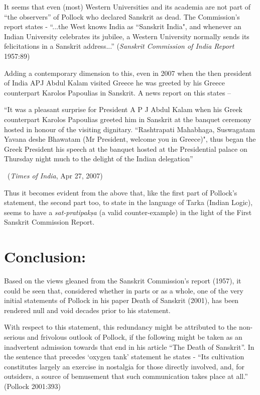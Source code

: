 It seems that even (most) Western Universities and its academia are not part of “the observers” of Pollock who declared Sanskrit as dead. The Commission’s report states  - “...the West knows India as ``Sanskrit India", and whenever an Indian University celebrates its jubilee, a Western University normally sends its felicitations in a Sanskrit address...” ({\sl Sanskrit Commission of India Report} 1957:89)

Adding a contemporary dimension to this, even in 2007 when the then president of India APJ Abdul Kalam visited Greece he was greeted by his Greece counterpart Karolos Papoulias in Sanskrit. A news report on this states –
\begin{myquote}
\eleven
“It was a pleasant surprise for President A P J Abdul Kalam when his Greek counterpart Karolos Papoulias greeted him in Sanskrit at the banquet ceremony hosted in honour of the visiting dignitary.  ``Rashtrapati Mahabhaga, Suswagatam Yavana deshe Bhawatam (Mr President, welcome you in Greece)", thus began the Greek President his speech at the banquet hosted at the Presidential palace on Thursday night much to the delight of the Indian delegation” 
\vskip -5pt

~\hfill ({\sl Times of India}, Apr 27, 2007) 
\end{myquote}

Thus it becomes evident from the above that, like the first part of Pollock’s statement, the second part too, to state in the language of Tarka (Indian Logic), seems to have a {\sl sat-pratipakṣa} (a valid counter-example) in the light of the First Sanskrit Commission Report.

\section{Conclusion:}

Based on the views gleaned from the Sanskrit Commission’s report (1957), it could be seen that, considered whether in parts or as a whole, one of the very initial statements of Pollock in his paper Death of Sanskrit (2001), has been rendered null and void decades prior to his statement.

With respect to this statement, this redundancy might be attributed to the non-serious and frivolous outlook of Pollock, if the following might be taken as an inadvertent admission towards that end in his article “The Death of Sanskrit”. In the sentence that precedes ‘oxygen tank’ statement he states - “Its cultivation constitutes largely an exercise in nostalgia for those directly involved, and, for outsiders, a source of bemusement that such communication takes place at all.” (Pollock  2001:393)


